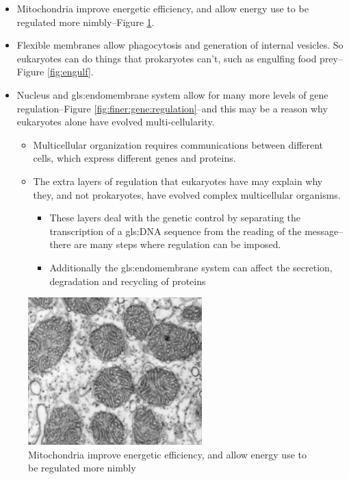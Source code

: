 \documentclass[]{article}
\begin{document}
\begin{itemize}
	\item Mitochondria improve energetic efficiency, and allow energy use to be regulated more nimbly--Figure \ref{fig:EukaryotesMoreEfficient}.
	
	\item Flexible membranes allow phagocytosis and generation of internal vesicles. So eukaryotes can do things that prokaryotes can't, such as engulfing food prey--Figure \ref{fig:engulf}.
	
	\item Nucleus and \gls{gls:endomembrane} system allow for many more levels of gene
	regulation--Figure \ref{fig:finer:gene:regulation}--and this may be a reason why eukaryotes alone have evolved multi-cellularity.
	\begin{itemize}
		\item Multicellular organization requires communications between different cells, which express different genes and proteins.
		\item The extra layers of regulation that eukaryotes have may explain why they, and not prokaryotes, have evolved complex multicellular organisms. 
		\begin{itemize}
			\item These layers deal with the genetic control by separating the transcription of a \gls{gls:DNA} sequence from the reading of the message--there are many steps where regulation can be imposed. 
			\item Additionally the \gls{gls:endomembrane} system can affect the secretion, degradation and recycling of proteins
		\end{itemize}
	\end{itemize}
\end{itemize}

\begin{figure}[H]
	\begin{center}
		\caption[Mitochondria improve energetic efficiency]{Mitochondria improve energetic efficiency, and allow energy use to be regulated more nimbly\cite{lane2010energetics}}\label{fig:EukaryotesMoreEfficient}
		\includegraphics[width=0.6\textwidth]{EukaryotesMoreEfficient}
	\end{center}
\end{figure}
\end{document}
